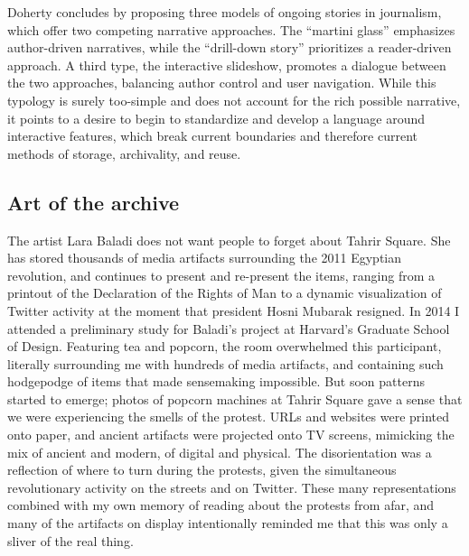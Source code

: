 Doherty concludes by proposing three models of ongoing stories in journalism, which offer two competing narrative approaches. The ``martini glass'' emphasizes author-driven narratives, while the ``drill-down story'' prioritizes a reader-driven approach. A third type, the interactive slideshow, promotes a dialogue between the two approaches, balancing author control and user navigation. While this typology is surely too-simple and does not account for the rich possible narrative, it points to a desire to begin to standardize and develop a language around interactive features, which break current boundaries and therefore current methods of storage, archivality, and reuse.

\subsection{Art of the archive}

The artist Lara Baladi does not want people to forget about Tahrir Square. She has stored thousands of media artifacts surrounding the 2011 Egyptian revolution, and continues to present and re-present the items, ranging from a printout of the Declaration of the Rights of Man to a dynamic visualization of Twitter activity at the moment that president Hosni Mubarak resigned. In 2014 I attended a preliminary study for Baladi's project at Harvard's Graduate School of Design. Featuring tea and popcorn, the room overwhelmed this participant, literally surrounding me with hundreds of media artifacts, and containing such hodgepodge of items that made sensemaking impossible. But soon patterns started to emerge; photos of popcorn machines at Tahrir Square gave a sense that we were experiencing the smells of the protest. URLs and websites were printed onto paper, and ancient artifacts were projected onto TV screens, mimicking the mix of ancient and modern, of digital and physical. The disorientation was a reflection of where to turn during the protests, given the simultaneous revolutionary activity on the streets and on Twitter. These many representations combined with my own memory of reading about the protests from afar, and many of the artifacts on display intentionally reminded me that this was only a sliver of the real thing.


